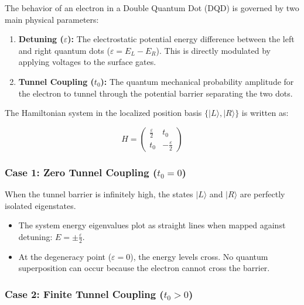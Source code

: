 \documentclass[
]{article}
\providecommand{\tightlist}{%
  \setlength{\itemsep}{0pt}\setlength{\parskip}{0pt}}
\begin{document}
The behavior of an electron in a Double Quantum Dot (DQD) is governed by
two main physical parameters:

\begin{enumerate}
\def\labelenumi{\arabic{enumi}.}
\tightlist
\item
  \textbf{Detuning (\(\varepsilon\)):} The electrostatic potential
  energy difference between the left and right quantum dots
  (\(\varepsilon = E_L - E_R\)). This is directly modulated by applying
  voltages to the surface gates.
\item
  \textbf{Tunnel Coupling (\(t_0\)):} The quantum mechanical probability
  amplitude for the electron to tunnel through the potential barrier
  separating the two dots.
\end{enumerate}

The Hamiltonian system in the localized position basis
\(\{|L\rangle, |R\rangle\}\) is written as:

\[H = \begin{pmatrix} \frac{\varepsilon}{2} & t_0 \\ t_0 & -\frac{\varepsilon}{2} \end{pmatrix}\]

\subsubsection{\texorpdfstring{Case 1: Zero Tunnel Coupling
(\(t_0 = 0\))}{Case 1: Zero Tunnel Coupling (t\_0 = 0)}}\label{case-1-zero-tunnel-coupling-t_0-0}

When the tunnel barrier is infinitely high, the states \(|L\rangle\) and
\(|R\rangle\) are perfectly isolated eigenstates.

\begin{itemize}
\tightlist
\item
  The system energy eigenvalues plot as straight lines when mapped
  against detuning: \(E = \pm\frac{\varepsilon}{2}\).
\item
  At the degeneracy point (\(\varepsilon = 0\)), the energy levels
  cross. No quantum superposition can occur because the electron cannot
  cross the barrier.
\end{itemize}

\subsubsection{\texorpdfstring{Case 2: Finite Tunnel Coupling
(\(t_0 > 0\))}{Case 2: Finite Tunnel Coupling (t\_0 \textgreater{} 0)}}\label{case-2-finite-tunnel-coupling-t_0-0}
\end{document}
